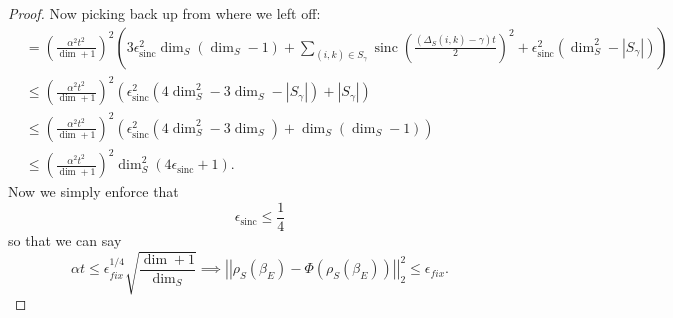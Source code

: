 \documentclass{article}
\newcommand{\parens}[1]{\left( #1 \right)}
\newcommand{\norm}[1]{\left| \left| #1 \right| \right|}
\DeclareMathOperator{\sinc}{sinc}
\begin{document}
\begin{proof}
Now picking back up from where we left off:
\begin{align}
    &= \parens{\frac{\alpha^2 t^2}{\dim + 1}}^2 (3 \epsilon_{\sinc}^2 \dim_S (\dim_S - 1) + \sum_{(i,k) \in S_{\gamma}} \sinc\parens{\frac{(\Delta_S(i,k) - \gamma)t}{2}}^2 + \epsilon_{\sinc}^2 (\dim_S^2 - |S_{\gamma}|)) \\
    &\leq \parens{\frac{\alpha^2 t^2}{\dim + 1}}^2 \parens{\epsilon_{\sinc}^2 (4 \dim_S^2 - 3 \dim_S - |S_{\gamma}|) + |S_{\gamma}|} \\
    &\leq \parens{\frac{\alpha^2 t^2}{\dim + 1}}^{2} \parens{\epsilon_{\sinc}^2 (4 \dim_S^2 - 3 \dim_S) + \dim_S(\dim_S - 1)} \\
    &\leq \parens{\frac{\alpha^2 t^2}{\dim + 1}}^2 \dim_S^2 (4 \epsilon_{\sinc} + 1). \label{eq:fixed_pt_bound_1}
\end{align}
Now we simply enforce that 
\begin{equation}
    \epsilon_{\sinc} \leq \frac{1}{4}
\end{equation}
so that we can say 
\begin{equation}
    \alpha t \leq \epsilon_{fix}^{1/4} \sqrt{\frac{\dim + 1}{\dim_S}} \implies \norm{\rho_S(\beta_E) - \Phi(\rho_S(\beta_E))}_2^2 \leq \epsilon_{fix}.
\end{equation}
\end{proof}
\end{document}
